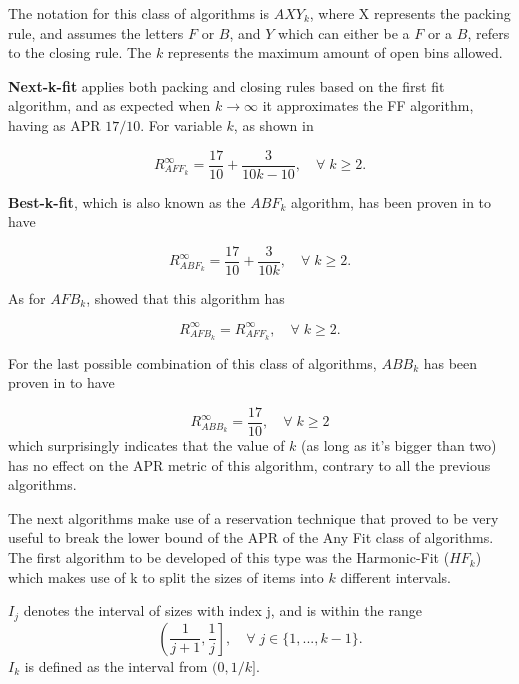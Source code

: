 The notation for this class of algorithms is $AXY_k$, where X represents the packing rule, and assumes the letters $F$ or $B$, and $Y$ which can either be a $F$ or a $B$, refers to the closing rule. The $k$ represents the maximum amount of open bins allowed.

\textbf{Next-k-fit} applies both packing and closing rules based on the first fit algorithm, and as expected when $k \to \infty$ it approximates the FF algorithm, having as APR $17/10$. For variable $k$, as shown in \cite{mao1993tight}

\begin{equation}
    R_{AFF_k}^\infty = \frac{17}{10} + \frac{3}{10k - 10}, \quad \forall \; k \geq 2.
\end{equation}

\textbf{Best-k-fit}, which is also known as the $ABF_k$ algorithm, has been proven in \cite{mao1993besk} to have

\begin{equation}
    R_{ABF_k}^\infty = \frac{17}{10} + \frac{3}{10k}, \quad  \forall \; k \geq 2.
\end{equation}

As for $AFB_k$, \cite{zhang1994tight} showed that this algorithm has

\begin{equation}
    R_{AFB_k}^\infty = R_{AFF_k}^\infty, \quad  \forall \; k \geq 2.
\end{equation}

For the last possible combination of this class of algorithms, $ABB_k$ has been proven in \cite{csirik2001bounded} to have 

\begin{equation}
    R_{ABB_k}^\infty = \frac{17}{10},  \quad \forall \; k \geq 2
\end{equation}
which surprisingly indicates that the value of $k$ (as long as it's bigger than two) has no effect on the APR metric of this algorithm, contrary to all the previous algorithms.

The next algorithms make use of a reservation technique that proved to be very useful to break the lower bound of the APR of the Any Fit class of algorithms. The first algorithm to be developed of this type was the Harmonic-Fit ($HF_k$) which makes use of k to split the sizes of items into $k$ different intervals.

$I_j$ denotes the interval of sizes with index j, and is within the range 
\begin{equation}
    \left (\frac{1}{j+1}, \frac{1}{j} \right], \quad \forall \; j \in \{1, ..., k-1\}.
\end{equation}
$I_k$ is defined as the interval from $(0, 1/k]$.


